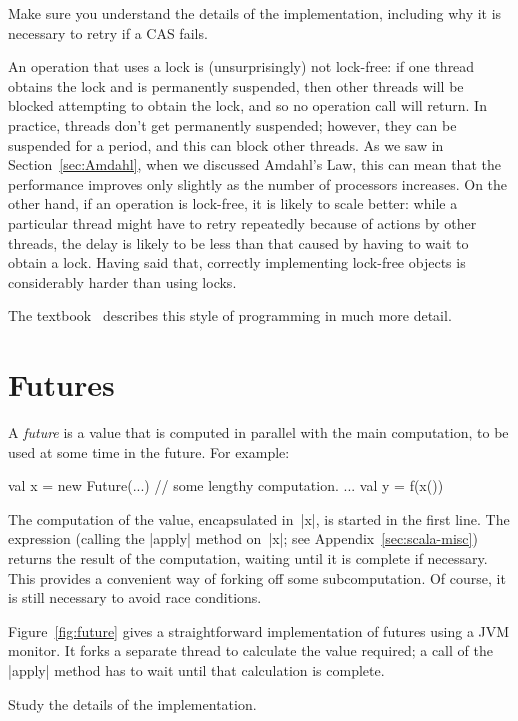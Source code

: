 
\begin{instruction}
Make sure you understand the details of the implementation, including why it
is necessary to retry if a CAS fails. 
\end{instruction}

An operation that uses a lock is (unsurprisingly) not lock-free: if one thread
obtains the lock and is permanently suspended, then other threads will be
blocked attempting to obtain the lock, and so no operation call will return.
In practice, threads don't get permanently suspended; however, they can be
suspended for a period, and this can block other threads.  As we saw in
Section~\ref{sec:Amdahl}, when we discussed Amdahl's Law, this can mean that
the performance improves only slightly as the number of processors increases.
On the other hand, if an operation is lock-free, it is likely to scale better:
while a particular thread might have to retry repeatedly because of actions by
other threads, the delay is likely to be less than that caused by having to
wait to obtain a lock.  Having said that, correctly implementing lock-free
objects is considerably harder than using locks. 

The textbook~\cite{herlihy-shavit} describes this style of programming in much
more detail. 



\section{Futures}

A \emph{future} is a value that is computed in parallel with the main
computation, to be used at some time in the future.  For example:
%
\begin{scala}
  val x = new Future(...) // some lengthy computation. 
  ...
  val y = f(x())
\end{scala}
%
The computation of the value, encapsulated in~|x|, is started in the first
line.  The expression  (calling the |apply| method on~|x|; see
Appendix~\ref{sec:scala-misc}) returns the result of the computation, waiting
until it is complete if necessary.  This provides a convenient way of forking
off some subcomputation.  Of course, it is still necessary to avoid race
conditions.

Figure~\ref{fig:future} gives a straightforward implementation of futures
using a JVM monitor.  It forks a separate thread to calculate the value
required; a call of the |apply| method has to wait until that calculation is
complete.
%
\begin{instruction}
Study the details of the implementation. 
\end{instruction}

